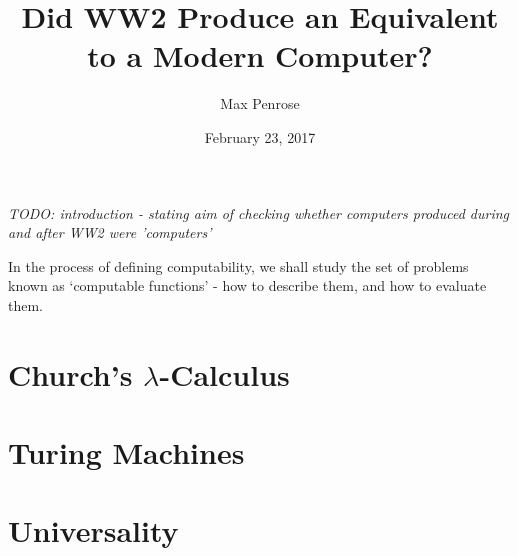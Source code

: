 \documentclass {article}
\title{Did WW2 Produce an Equivalent to a Modern Computer?}
\date{February 23, 2017}
\author{Max Penrose}
\begin{document}
\maketitle
\tableofcontents
\clearpage
\textit{TODO: introduction - stating aim of checking whether computers produced during and after WW2 were 'computers'}

In the process of defining computability, we shall study the set of problems known as `computable functions' - how to describe them, and how to evaluate them. 

\section{Church's $\lambda$-Calculus}



\section{Turing Machines}



\section{Universality}




\end{document}
